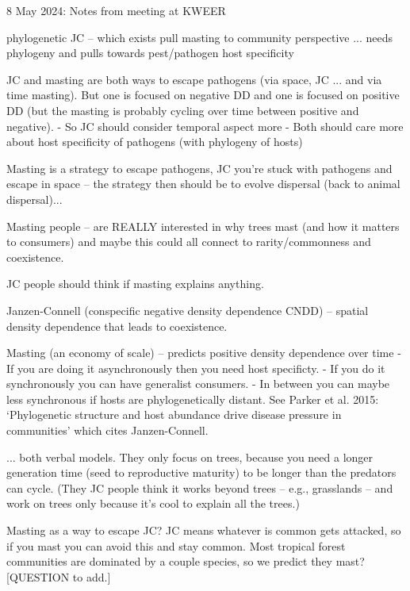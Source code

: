 \documentclass[11pt]{article}
\begin{document}

\renewcommand{\refname}{\CHead{}}

\setlength{\parindent}{0cm}
\setlength{\parskip}{5pt}

8 May 2024: Notes from meeting at KWEER 

phylogenetic JC -- which exists
pull masting to community perspective ... needs phylogeny and pulls towards pest/pathogen host specificity 

JC and masting are both ways to escape pathogens (via space, JC ... and via time masting). But one is focused on negative DD and one is focused on positive DD (but the masting is probably cycling over time between positive and negative). 
- So JC should consider temporal aspect more
- Both should care more about host specificity of pathogens (with phylogeny of hosts)

Masting is a strategy to escape pathogens, JC you're stuck with pathogens and escape in space -- the strategy then should be to evolve dispersal (back to animal dispersal)... 

Masting people -- are REALLY interested in why trees mast (and how it matters to consumers) and maybe this could all connect to rarity/commonness and coexistence. 

JC people should think if masting explains anything. 

Janzen-Connell (conspecific negative density dependence CNDD) -- spatial density dependence that leads to coexistence. 

Masting (an economy of scale) -- predicts positive density dependence over time  
- If you are doing it asynchronously then you need host specificty.
- If you do it synchronously you can have generalist consumers.
- In between you can maybe less synchronous if hosts are phylogenetically distant. See Parker et al. 2015: `Phylogenetic structure and host abundance drive disease pressure in communities' which cites Janzen-Connell. 

... both verbal models. They only focus on trees, because you need a longer generation time (seed to reproductive maturity) to be longer than the predators can cycle. (They JC people think it works beyond trees -- e.g., grasslands -- and work on trees only because it's cool to explain all the trees.)

Masting as a way to escape JC? JC means whatever is common gets attacked, so if you mast you can avoid this and stay common. Most tropical forest communities are dominated by a couple species, so we predict they mast? [QUESTION to add.]
\end{document}
